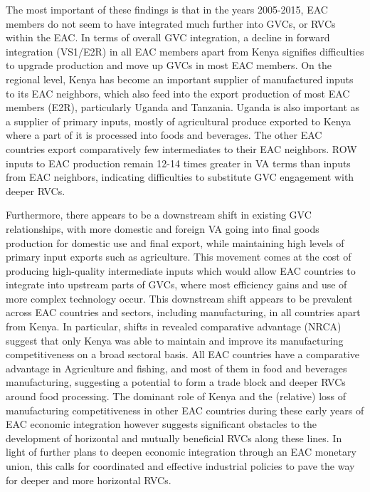 \documentclass[a4paper]{article}
\begin{document}
The most important of these findings is that in the years 2005-2015, EAC members do not seem to have integrated much further into GVCs, or RVCs within the EAC. In terms of overall GVC integration, a decline in forward integration (VS1/E2R) in all EAC members apart from Kenya signifies difficulties to upgrade production and move up GVCs in most EAC members.  On the regional level, Kenya has become an important supplier of manufactured inputs to its EAC neighbors, which also feed into the export production of most EAC members (E2R), particularly Uganda and Tanzania. Uganda is also important as a supplier of primary inputs, mostly of agricultural produce exported to Kenya where a part of it is processed into foods and beverages. The other EAC countries export comparatively few intermediates to their EAC neighbors. ROW inputs to EAC production remain 12-14 times greater in VA terms than inputs from EAC neighbors, indicating difficulties to substitute GVC engagement with deeper RVCs.  \newline

Furthermore, there appears to be a downstream shift in existing GVC relationships, with more domestic and foreign VA going into final goods production for domestic use and final export, while maintaining high levels of primary input exports such as agriculture. This movement comes at the cost of producing high-quality intermediate inputs which would allow EAC countries to integrate into upstream parts of GVCs, where most efficiency gains and use of more complex technology occur. This downstream shift appears to be prevalent across EAC countries and sectors, including manufacturing, in all countries apart from Kenya. In particular, shifts in revealed comparative advantage (NRCA) suggest that only Kenya was able to maintain and improve its manufacturing competitiveness on a broad sectoral basis. All EAC countries have a comparative advantage in Agriculture and fishing, and most of them in food and beverages manufacturing, suggesting a potential to form a trade block and deeper RVCs around food processing. The dominant role of Kenya and the (relative) loss of manufacturing competitiveness in other EAC countries during these early years of EAC economic integration however suggests significant obstacles to the development of horizontal and mutually beneficial RVCs along these lines. In light of further plans to deepen economic integration through an EAC monetary union, this calls for coordinated and effective industrial policies to pave the way for deeper and more horizontal RVCs. \newline 
\end{document}
